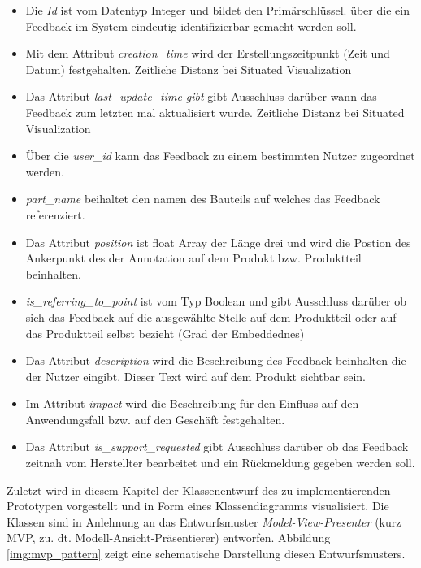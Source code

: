 \begin{itemize}
\item{Die \textit{Id} ist vom Datentyp Integer und bildet den Primärschlüssel. über die ein Feedback im System eindeutig identifizierbar gemacht werden soll.}
\item{Mit dem Attribut \textit{creation\_time} wird der Erstellungszeitpunkt (Zeit und Datum) festgehalten. Zeitliche Distanz bei Situated Visualization}
\item{Das Attribut \textit{last\_update\_time gibt} gibt Ausschluss darüber wann das Feedback zum letzten mal aktualisiert wurde. Zeitliche Distanz bei Situated Visualization}
\item{Über die \textit{user\_id} kann das Feedback zu einem bestimmten Nutzer zugeordnet werden.}
\item{\textit{part\_name} beihaltet den namen des Bauteils auf welches das Feedback referenziert.}
\item{Das Attribut \textit{position} ist float Array der Länge drei und wird die Postion des Ankerpunkt des der Annotation auf dem Produkt bzw. Produktteil beinhalten.}
\item{\textit{is\_referring\_to\_point} ist vom Typ Boolean und gibt Ausschluss darüber ob sich das Feedback auf die ausgewählte Stelle auf dem Produktteil oder auf das Produktteil selbst bezieht (Grad der Embeddednes)}
\item{Das Attribut \textit{description} wird die Beschreibung des Feedback beinhalten die der Nutzer eingibt. Dieser Text wird auf dem Produkt sichtbar sein.}
\item{Im Attribut \textit{impact} wird die Beschreibung für den Einfluss auf den Anwendungsfall bzw. auf den Geschäft festgehalten.}
\item{Das Attribut \textit{is\_support\_requested} gibt Ausschluss darüber ob das Feedback zeitnah vom Herstellter bearbeitet und ein Rückmeldung gegeben werden soll.}
\end{itemize}

Zuletzt wird in diesem Kapitel der Klassenentwurf des zu implementierenden Prototypen vorgestellt und in Form eines Klassendiagramms visualisiert.  
Die Klassen sind in Anlehnung an das Entwurfsmuster \textit{Model-View-Presenter} (kurz MVP, zu. dt. Modell-Ansicht-Präsentierer) entworfen. 
Abbildung \ref{img:mvp_pattern} zeigt eine schematische Darstellung diesen Entwurfsmusters. 

